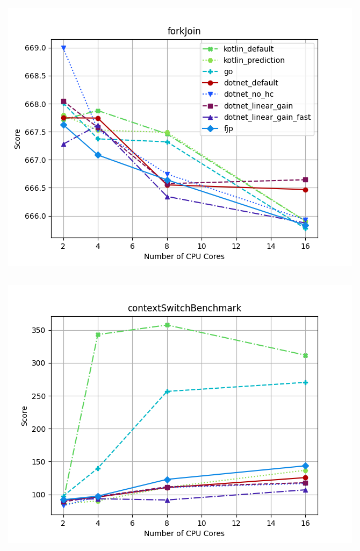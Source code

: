 \documentclass{article}
\begin{document}
\begin{figure}[H]
    \begin{subfigure}[b]{0.48\textwidth}
        \includegraphics[width=\linewidth]{plots/forkJoin_with_legend.png}
    \end{subfigure}
    \begin{subfigure}[b]{0.48\textwidth}
        \includegraphics[width=\linewidth]{plots/contextSwitchBenchmark.png}
    \end{subfigure}
\end{figure}
\end{document}
